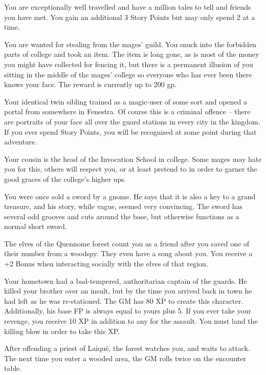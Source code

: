 \begin{multicols}{2}
\begin{list}{\addtocounter{list}{1}\textbf{:}}{\raggedleft}
	\item{You are exceptionally well travelled and have a million tales to tell and friends you have met.  You gain an additional 3 Story Points but may only spend 2 at a time. }

	\item{ You are wanted for stealing from the mages' guild.  You snuck into the forbidden parts of \gls{college} and took an item.  The item is long gone, as is most of the money you might have collected for fencing it, but there is a permanent illusion of you sitting in the middle of the mages' \gls{college} so everyone who has ever been there knows your face.  The reward is currently up to 200 gp. }

	\item{ Your identical twin sibling trained as a magic-user of some sort and opened a portal from somewhere in Fenestra.  Of course this is a criminal offence -- there are portraits of your face all over the guard stations in every city in the kingdom.  If you ever spend Story Points, you will be recognised at some point during that adventure. }

	\item{ Your cousin is the head of the Invocation School in \gls{college}. Some mages may hate you for this, others will respect you, or at least pretend to in order to garner the good graces of the \gls{college}'s higher ups. }

	\item{ You were once sold a sword by a gnome.  He says that it is also a key to a grand treasure, and his story, while vague, seemed very convincing.  The sword has several odd grooves and cuts around the base, but otherwise functions as a normal short sword. }

	\item{The elves of the Quennome forest count you as a friend after you saved one of their number from a woodspy.  They even have a song about you. You receive a +2 Bonus when interacting socially with the elves of that region.}

	\item{Your hometown had a bad-tempered, authoritarian captain of the guards. He killed your brother over an insult, but by the time you arrived back in town he had left as he was re-stationed.  The GM has 80 XP to create this character.  Additionally, his base FP is always equal to yours plus 5.  If you ever take your revenge, you receive 10 XP in addition to any for the assault.  You must land the killing blow in order to take this XP.}
	\item{After offending a priest of Laiqu\"{e}, the forest watches you, and waits to attack.  The next time you enter a wooded area, the GM rolls twice on the encounter table.}


\end{list}
\end{multicols}
